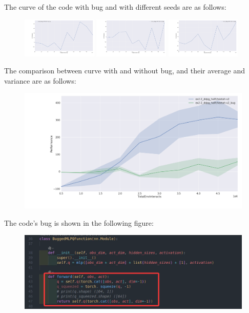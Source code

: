 \begin{homeworkProblem}
\begin{itemize}
    The curve of the code with bug and with different seeds are as follows:
    \begin{figure}[H]
        \centering
        \includegraphics[width=0.32\textwidth]{../Img/spinningup_exercises/2_2/2_2_bug_curve_s0.png}
        \includegraphics[width=0.32\textwidth]{../Img/spinningup_exercises/2_2/2_2_bug_curve_s10.png}
        \includegraphics[width=0.32\textwidth]{../Img/spinningup_exercises/2_2/2_2_bug_curve_s20.png}
    \end{figure}

    The comparison between curve with and without bug, and their average and variance are as follows:
    \begin{figure}[H]
        \centering
        \includegraphics[width=\textwidth]{../Img/spinningup_exercises/2_2/2_2_curve_all.png}
    \end{figure}

    The code's bug is shown in the following figure:
    \begin{figure}[H]
        \centering
        \includegraphics[width=\textwidth]{../Img/spinningup_exercises/2_2/2_2_mistake.png}
    \end{figure}



\end{itemize}
\end{homeworkProblem}
